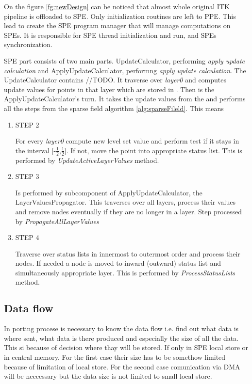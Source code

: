 On the figure \ref{fg:newDesign} can be noticed that almost whole original ITK pipeline is offloaded to SPE. Only initialization routines are left to PPE. This lead to create the SPE program manager that will manage computations on SPEs. It is responsible for SPE thread initialization and run, and SPEs synchronization.

SPE part consists of two main parts. UpdateCalculator, performing \emph{apply
update calculation} and ApplyUpdateCalculator, performng \emph{apply update
calculation}. The UpdateCalculator contains //TODO. It traverse over
\emph{layer0} and computes update values for points in that layer which are
stored in . Then is the ApplyUpdateCalculator's turn. It
takes the update values from the  and performs all the
steps from the sparse field algorithm \ref{alg:sparseFileld}. This means
\begin{enumerate}
\item STEP 2
\par
For every \emph{layer0} compute new level set value and perform test if
it stays in the interval [-$\frac{1}{2}$,$\frac{1}{2}$]. If not, move the point
into appropriate status list. This is performed by
\emph{UpdateActiveLayerValues} method.

\item STEP 3
\par
Is performed by subcomponent of ApplyUpdateCalculator, the
LayerValuesPropagator. This traverses over all layers, process their values and
remove nodes eventually if they are no longer in a layer. Step processed by
\emph{PropagateAllLayerValues}


\item STEP 4
\par
Traverse over status lists in innermost to outermost order and process their
nodes. If needed a node is moved to inward (outward) status list and
simultaneously appropriate layer. This is performed by \emph{ProcessStatusLists}
method.
\end{enumerate}

\subsection{Data flow}

In porting procese is necessary to know the data flow i.e. find out what data is
where sent, what data is there produced and especially the size of all the data.
This si because of decision where thay will be stored. If only in SPE local
store or in central memory. For the first case their size has to be somethow
limited because of limitation of local store. For the second case comunication
via DMA will be neccessary but the data size is not limited to small local
store.

